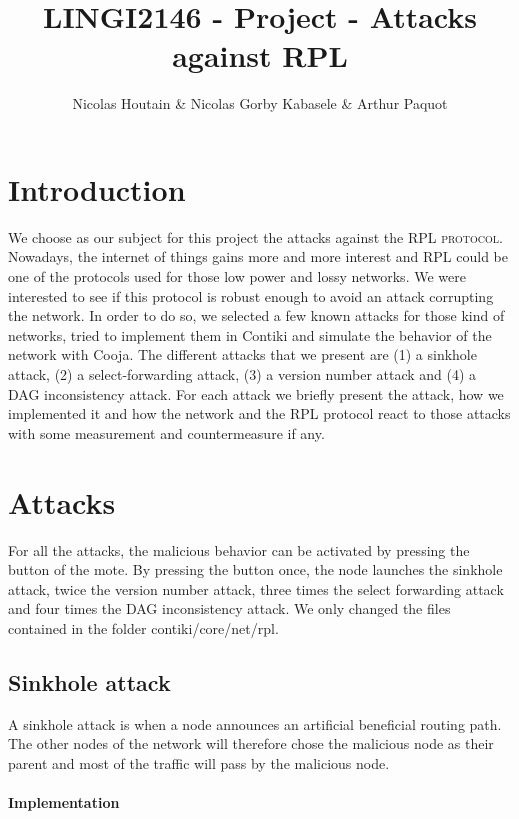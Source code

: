 \documentclass[11pt]{report}
\title{LINGI2146 - Project - Attacks against RPL}
\author{Nicolas Houtain \& Nicolas Gorby Kabasele \& Arthur Paquot}
\begin{document}
\maketitle
\section{Introduction}

We choose as our subject for this project the attacks against the
\textsc{RPL protocol}. Nowadays, the internet of things gains more and
more interest and \textsc{RPL} could be one of the protocols used for
those low power and lossy networks. 
We were interested to see if this protocol is robust enough to
avoid an attack corrupting the network. In order to do so, we selected a
few known attacks for those kind of networks, tried to implement
them in Contiki and simulate the behavior of the network with Cooja. 
The different attacks that we present are (1) a sinkhole attack, (2) a
select-forwarding attack, (3) a version number attack and (4) a DAG
inconsistency attack. For each attack we briefly present the attack, how
we implemented it and how the network and the \textsc{RPL} protocol react to
those attacks with some measurement and countermeasure if any. 

\section{Attacks}

For all the attacks, the malicious behavior can be activated by pressing
the button of the mote. By pressing the button once, the node launches
the sinkhole attack, twice the version number attack, three times the
select forwarding attack and four times the DAG inconsistency attack. We
only changed the files contained in the folder contiki/core/net/rpl.

\subsection{Sinkhole attack}

A sinkhole attack is when a node announces an artificial beneficial
routing path. The other nodes of the network will therefore chose the
malicious node as their parent and most of the traffic will pass by the
malicious node.

\paragraph{Implementation}
\end{document}
